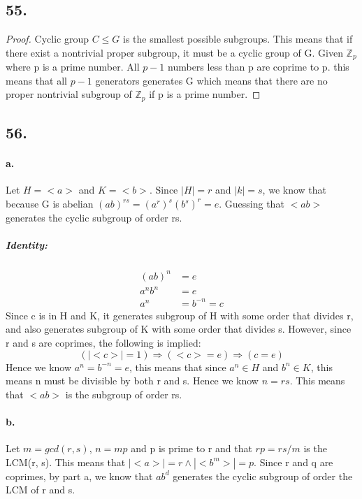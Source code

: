 \documentclass{article}
\begin{document}
\subsection*{55. }
\begin{proof}
	Cyclic group $C \le G$ is the smallest possible subgroups. This means that if
	there exist a nontrivial proper subgroup, it must be a cyclic group of G. Given
	$\mathbb{Z}_p$ where p is a prime number. All $p-1$ numbers less than p are
	coprime to p. this means that all $p-1$ generators generates G which means that
	there are no proper nontrivial subgroup of $\mathbb{Z}_p$ if p is a prime
	number.
\end{proof}

\subsection*{56. }
\paragraph{a. } Let $H=<a>$ and $K=<b>$. Since $|H|=r$ and $|k|=s$, we know that
because G is abelian $(ab)^{rs}=(a^r)^s(b^s)^r=e$. Guessing that $<ab>$
generates the cyclic subgroup of order rs.
\subparagraph{Identity: } 
\begin{align*}
	(ab)^n &= e\\
	a^nb^n &= e\\
	a^n &= b^{-n} = c
\end{align*}
Since c is in H and K, it generates subgroup of H with some order that divides
r, and also generates subgroup of K with some order that divides s. However,
since r and s are coprimes, the following is implied: 
	$$(|<c>| = 1) \Rightarrow (<c>={e}) \Rightarrow (c=e)$$
Hence we know $a^n = b^{-n} = e$, this means that since $a^n \in H$ and $b^n \in
K$, this means n must be divisible by both r and s. Hence we know $n = rs$. This
means that $<ab>$ is the subgroup of order rs.

\paragraph{b. } Let $m=gcd(r, s)$, $n = mp$ and p is prime to r and that $rp =
rs/m$ is the LCM(r, s). This means that $|<a>|=r \wedge |<b^m>|=p$. Since r and
q are coprimes, by part a, we know that $ab^d$ generates the cyclic subgroup of
order the LCM of r and s.
\end{document}
